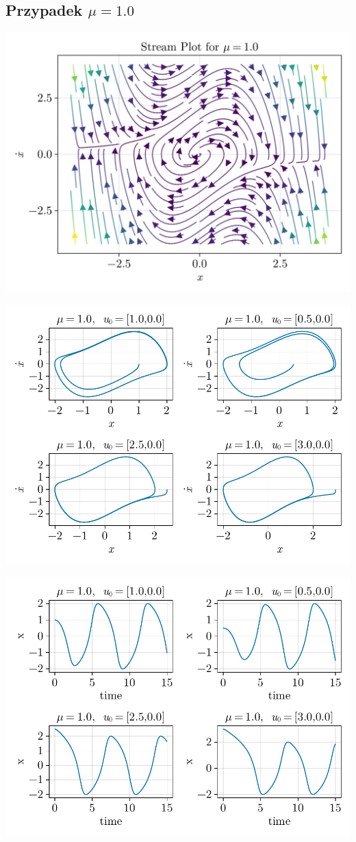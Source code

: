 \clearpage

%
%
\subsection{Przypadek $\mu = 1.0$}
\includegraphics[width=\textwidth]{out/stream_07.png}

\includegraphics[width=\textwidth]{out/phase_07.pdf}

\includegraphics[width=\textwidth]{out/xfromt_07.pdf}

